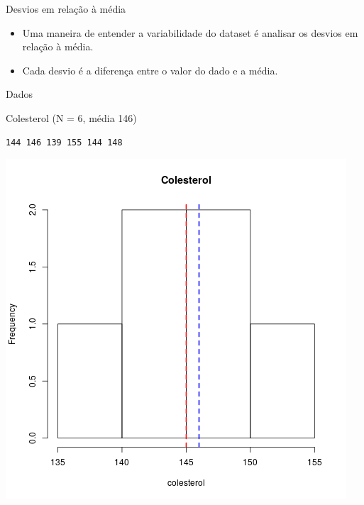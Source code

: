 \documentclass{beamer}
\begin{document}
\begin{frame}{\scriptsize Desvios em relação à média}
  \begin{itemize}
    \footnotesize
  \item Uma maneira de entender a variabilidade do dataset é analisar
    os desvios em relação à média.
    \bigskip
  \item Cada desvio é a diferença entre o valor do dado e a média.
  \end{itemize}
\end{frame}

\begin{frame}[fragile]{\scriptsize Dados}
  \begin{exampleblock}{Colesterol (N = 6, média 146)}
    \begin{center}
    \tiny
\begin{verbatim}
144 146 139 155 144 148
\end{verbatim}
    \bigskip
    \includegraphics[height=.5\textheight]{Cap3/histograma-colesterol}
  \end{center}
\end{exampleblock}
\end{frame}
\end{document}
